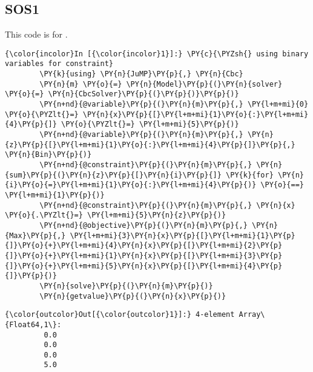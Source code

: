 \subsection{SOS1}
This code is for .
\label{code:SOS1}

    \begin{Verbatim}[commandchars=\\\{\}]
{\color{incolor}In [{\color{incolor}1}]:} \PY{c}{\PYZsh{} using binary variables for constraint}
        \PY{k}{using} \PY{n}{JuMP}\PY{p}{,} \PY{n}{Cbc}
        \PY{n}{m} \PY{o}{=} \PY{n}{Model}\PY{p}{(}\PY{n}{solver} \PY{o}{=} \PY{n}{CbcSolver}\PY{p}{(}\PY{p}{)}\PY{p}{)}
        \PY{n+nd}{@variable}\PY{p}{(}\PY{n}{m}\PY{p}{,} \PY{l+m+mi}{0} \PY{o}{\PYZlt{}=} \PY{n}{x}\PY{p}{[}\PY{l+m+mi}{1}\PY{o}{:}\PY{l+m+mi}{4}\PY{p}{]} \PY{o}{\PYZlt{}=} \PY{l+m+mi}{5}\PY{p}{)}
        \PY{n+nd}{@variable}\PY{p}{(}\PY{n}{m}\PY{p}{,} \PY{n}{z}\PY{p}{[}\PY{l+m+mi}{1}\PY{o}{:}\PY{l+m+mi}{4}\PY{p}{]}\PY{p}{,} \PY{n}{Bin}\PY{p}{)}
        \PY{n+nd}{@constraint}\PY{p}{(}\PY{n}{m}\PY{p}{,} \PY{n}{sum}\PY{p}{(}\PY{n}{z}\PY{p}{[}\PY{n}{i}\PY{p}{]} \PY{k}{for} \PY{n}{i}\PY{o}{=}\PY{l+m+mi}{1}\PY{o}{:}\PY{l+m+mi}{4}\PY{p}{)} \PY{o}{==} \PY{l+m+mi}{1}\PY{p}{)}
        \PY{n+nd}{@constraint}\PY{p}{(}\PY{n}{m}\PY{p}{,} \PY{n}{x} \PY{o}{.\PYZlt{}=} \PY{l+m+mi}{5}\PY{n}{z}\PY{p}{)}
        \PY{n+nd}{@objective}\PY{p}{(}\PY{n}{m}\PY{p}{,} \PY{n}{Max}\PY{p}{,} \PY{l+m+mi}{3}\PY{n}{x}\PY{p}{[}\PY{l+m+mi}{1}\PY{p}{]}\PY{o}{+}\PY{l+m+mi}{4}\PY{n}{x}\PY{p}{[}\PY{l+m+mi}{2}\PY{p}{]}\PY{o}{+}\PY{l+m+mi}{1}\PY{n}{x}\PY{p}{[}\PY{l+m+mi}{3}\PY{p}{]}\PY{o}{+}\PY{l+m+mi}{5}\PY{n}{x}\PY{p}{[}\PY{l+m+mi}{4}\PY{p}{]}\PY{p}{)}
        \PY{n}{solve}\PY{p}{(}\PY{n}{m}\PY{p}{)}
        \PY{n}{getvalue}\PY{p}{(}\PY{n}{x}\PY{p}{)}
\end{Verbatim}


\begin{Verbatim}[commandchars=\\\{\}]
{\color{outcolor}Out[{\color{outcolor}1}]:} 4-element Array\{Float64,1\}:
         0.0
         0.0
         0.0
         5.0
\end{Verbatim}
            
